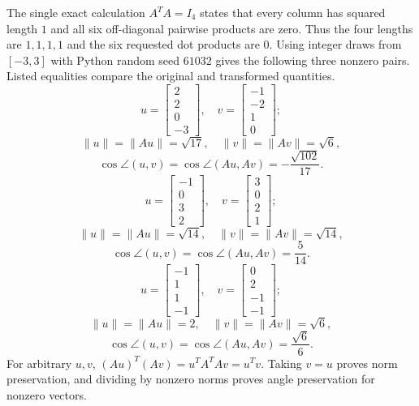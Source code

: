 The single exact calculation $A^TA=I_4$ states that every column has squared length $1$ and all six off-diagonal pairwise products are zero. Thus the four lengths are $1,1,1,1$ and the six requested dot products are $0$.
Using integer draws from $[-3,3]$ with Python random seed $61032$ gives the following three nonzero pairs. Listed equalities compare the original and transformed quantities.
\[u=\left[\begin{array}{r}2\\2\\0\\-3\end{array}\right],\quad v=\left[\begin{array}{r}-1\\-2\\1\\0\end{array}\right];\]
\[\|u\|=\|Au\|=\sqrt{17},\quad\|v\|=\|Av\|=\sqrt{6},\]
\[\cos\angle(u,v)=\cos\angle(Au,Av)=- \frac{\sqrt{102}}{17}.\]
\[u=\left[\begin{array}{r}-1\\0\\3\\2\end{array}\right],\quad v=\left[\begin{array}{r}3\\0\\2\\1\end{array}\right];\]
\[\|u\|=\|Au\|=\sqrt{14},\quad\|v\|=\|Av\|=\sqrt{14},\]
\[\cos\angle(u,v)=\cos\angle(Au,Av)=\frac{5}{14}.\]
\[u=\left[\begin{array}{r}-1\\1\\1\\-1\end{array}\right],\quad v=\left[\begin{array}{r}0\\2\\-1\\-1\end{array}\right];\]
\[\|u\|=\|Au\|=2,\quad\|v\|=\|Av\|=\sqrt{6},\]
\[\cos\angle(u,v)=\cos\angle(Au,Av)=\frac{\sqrt{6}}{6}.\]
For arbitrary $u,v$, $(Au)^T(Av)=u^TA^TAv=u^Tv$. Taking $v=u$ proves norm preservation, and dividing by nonzero norms proves angle preservation for nonzero vectors.

